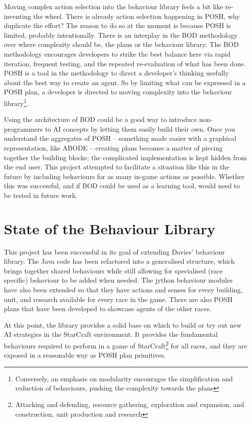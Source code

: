 \documentclass[11pt,openright,a4paper]{report}
\begin{document}
Moving complex action selection into the behaviour library feels a bit like re-inventing the wheel. There is already action selection happening in POSH, why duplicate the effort? The reason to do so at the moment is because POSH is limited, probably intentionally. There is an interplay in the BOD methodology over where complexity should be, the plans or the behaviour library. The BOD methodology encourages developers to strike the best balance here via rapid iteration, frequent testing, and the repeated re-evaluation of what has been done. POSH is a tool in the methodology to direct a developer's thinking usefully about the best way to create an agent. So by limiting what can be expressed in a POSH plan, a developer is directed to moving complexity into the behaviour library\footnote{Conversely, an emphasis on modularity encourages the simplification and reduction of behaviours, pushing the complexity towards the plans}.

Using the architecture of BOD could be a good way to introduce non-programmers to AI concepts by letting them easily build their own. Once you understand the aggregates of POSH -- something made easier with a graphical representation, like ABODE -- creating plans becomes a matter of piecing together the building blocks; the complicated implementation is kept hidden from the end user. This project attempted to facilitate a situation like this in the future by including behaviours for as many in-game actions as possible. Whether this was successful, and if BOD could be used as a learning tool, would need to be tested in future work.

\section{State of the Behaviour Library}
This project has been successful in its goal of extending Davies' behaviour library. The Java code has been refactored into a generalised structure, which brings together shared behaviours while still allowing for specialised (race specific) behaviour to be added when needed. The jython behaviour modules have also been extended so that they have actions and senses for every building, unit, and research available for every race in the game. There are also POSH plans that have been developed to showcase agents of the other races.

At this point, the library provides a solid base on which to build or try out new AI strategies in the StarCraft environment. It provides the fundamental behaviours required to perform in a game of StarCraft\footnote{Attacking and defending, resource gathering, exploration and expansion, and construction, unit production and research} for all races, and they are exposed in a reasonable way as POSH plan primitives.
\end{document}
